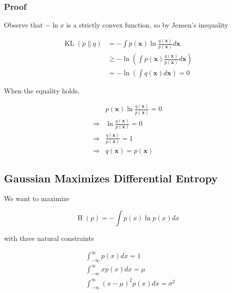 \documentclass{article}
\begin{document}
            \subsubsection*{Proof}

                Observe that $ - \ln x $ is a strictly convex function, so by Jensen's inequality

                \begin{align*}
                    \operatorname{KL}(p \| q)
                        &= - \int p(\mathbf{x}) \ln
                     \frac{q(\mathbf{x})}{p(\mathbf{x})} d \mathbf{x} \\
                        &\geq - \ln \left( \int p(\mathbf{x}) \frac{q(\mathbf{x})}{p(\mathbf{x})} d \mathbf{x} \right) \\
                        &=    - \ln \left( \int q(\mathbf{x}) d \mathbf{x} \right) = 0
                \end{align*}

                When the equality holds,

                \begin{align*}
                                & p(\mathbf{x}) \ln \frac{q(\mathbf{x})}{p(\mathbf{x})} = 0 \\
                    \Rightarrow & \ln \frac{q(\mathbf{x})}{p(\mathbf{x})} = 0 \\
                    \Rightarrow & \frac{q(\mathbf{x})}{p(\mathbf{x})} = 1 \\
                    \Rightarrow & q(\mathbf{x}) = p(\mathbf{x})
                \end{align*}

        \subsection{Gaussian Maximizes Differential Entropy}

            We want to maximize
            
            \begin{equation*}
                 \operatorname{H}(p) = - \int p(x) \ln p(x) dx
            \end{equation*}

            with three natural constraints

            \begin{align*}
                &\int_{-\infty}^\infty p(x) dx = 1 \\
                &\int_{-\infty}^\infty x p(x) dx = \mu \\
                &\int_{-\infty}^\infty (x-\mu)^2 p(x) dx = \sigma^2
            \end{align*}
\end{document}
